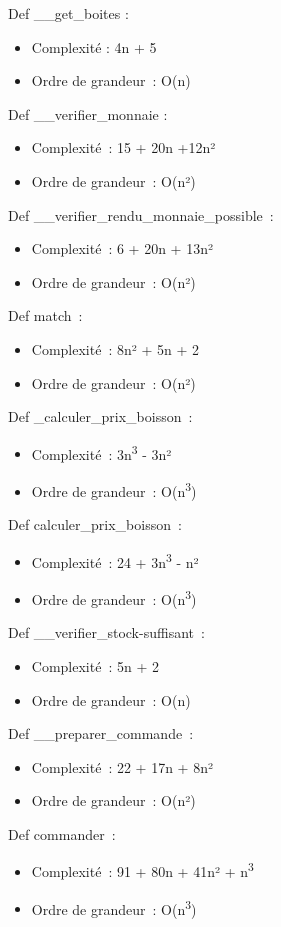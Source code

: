 \documentclass[]{article}
\begin{document}
Def \_\_get\_boites :

\begin{itemize}
\item
  Complexité : 4n + 5
\item
  Ordre de grandeur~: O(n)
\end{itemize}

Def \_\_verifier\_monnaie :

\begin{itemize}
\item
  Complexité~: 15 + 20n +12n²
\item
  Ordre de grandeur~: O(n²)
\end{itemize}

Def \_\_verifier\_rendu\_monnaie\_possible~:

\begin{itemize}
\item
  Complexité~: 6 + 20n + 13n²
\item
  Ordre de grandeur~: O(n²)
\end{itemize}

Def match~:

\begin{itemize}
\item
  Complexité~: 8n² + 5n + 2
\item
  Ordre de grandeur~: O(n²)
\end{itemize}

Def \_calculer\_prix\_boisson~:

\begin{itemize}
\item
  Complexité~: 3n\textsuperscript{3} - 3n²
\item
  Ordre de grandeur~: O(n\textsuperscript{3})
\end{itemize}

Def calculer\_prix\_boisson~:

\begin{itemize}
\item
  Complexité~: 24 + 3n\textsuperscript{3} - n²
\item
  Ordre de grandeur~: O(n\textsuperscript{3})
\end{itemize}

Def \_\_verifier\_stock-suffisant~:

\begin{itemize}
\item
  Complexité~: 5n + 2
\item
  Ordre de grandeur~: O(n)
\end{itemize}

Def \_\_preparer\_commande~:

\begin{itemize}
\item
  Complexité~: 22 + 17n + 8n²
\item
  Ordre de grandeur~: O(n²)
\end{itemize}

Def commander~:

\begin{itemize}
\item
  Complexité~: 91 + 80n + 41n² + n\textsuperscript{3}
\item
  Ordre de grandeur~: O(n\textsuperscript{3})
\end{itemize}
\end{document}
